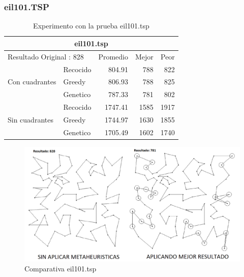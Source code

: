 \subsubsection{eil101.TSP}
\begin{table}[hbtp]
 \centering
\begin{tabular}{ | l   l | r | r | r |   }
	    \hline\multicolumn{5}{|c|}{ \rowcolor[gray]{0.8}eil101.tsp} \\\hline
         \multicolumn{2}{|l|}{Resultado Original : 828}   & Promedio & Mejor & Peor \\ \hline
                        & Recocido  & 804.91 & 788 & 822  \\ 
         Con cuadrantes & Greedy    & 806.93 & 788 & 825  \\ 
                        & Genetico  & 787.33 & 781 & 802  \\ \hline
                        & Recocido  & 1747.41 & 1585 & 1917   \\ 
         Sin cuadrantes & Greedy    & 1744.97 & 1630 & 1855   \\ 
                        & Genetico  & 1705.49 & 1602 & 1740    \\ \hline
    \end{tabular}
    \caption{Experimento con la prueba eil101.tsp}
    \label{table:EXP_eil101.tsp}
\end{table}
 \begin{figure}[hbtp]
    \centering
        \includegraphics[width=1\textwidth]{PruebasResultados/Experimentos_Comparativas/eil101.png}
        \caption{Comparativa eil101.tsp}
        \label{fig:eil101_comparativa.png}
\end{figure}
